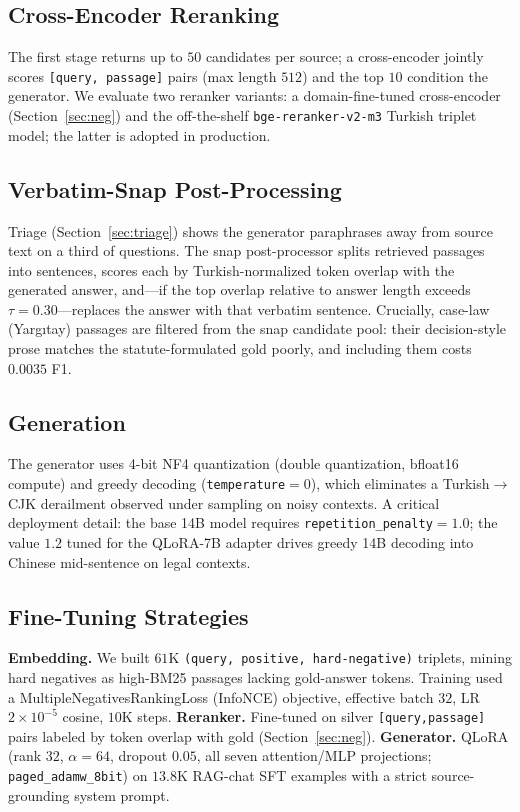 \documentclass[conference]{IEEEtran}
\begin{document}
\subsection{Cross-Encoder Reranking}
The first stage returns up to $50$ candidates per source; a cross-encoder
jointly scores \texttt{[query, passage]} pairs (max length $512$) and the top
$10$ condition the generator. We evaluate two reranker variants: a
domain-fine-tuned cross-encoder (Section~\ref{sec:neg}) and the off-the-shelf
\texttt{bge-reranker-v2-m3} Turkish triplet model; the latter is adopted in
production.

\subsection{Verbatim-Snap Post-Processing}
Triage (Section~\ref{sec:triage}) shows the generator paraphrases away from
source text on a third of questions. The snap post-processor splits retrieved
passages into sentences, scores each by Turkish-normalized token overlap with
the generated answer, and---if the top overlap relative to answer length exceeds
$\tau{=}0.30$---replaces the answer with that verbatim sentence. Crucially,
case-law (Yarg\i tay) passages are filtered from the snap candidate pool: their
decision-style prose matches the statute-formulated gold poorly, and including
them costs $0.0035$ F1.

\subsection{Generation}
The generator uses 4-bit NF4 quantization (double quantization, bfloat16
compute) and greedy decoding (\texttt{temperature}$=0$), which eliminates a
Turkish$\rightarrow$CJK derailment observed under sampling on noisy contexts.
A critical deployment detail: the base 14B model requires
\texttt{repetition\_penalty}$=1.0$; the value $1.2$ tuned for the QLoRA-7B
adapter drives greedy 14B decoding into Chinese mid-sentence on legal contexts.

\subsection{Fine-Tuning Strategies}
\textbf{Embedding.} We built $61$K \texttt{(query, positive, hard-negative)}
triplets, mining hard negatives as high-BM25 passages lacking gold-answer
tokens. Training used a MultipleNegativesRankingLoss (InfoNCE) objective,
effective batch $32$, LR $2{\times}10^{-5}$ cosine, $10$K steps.
\textbf{Reranker.} Fine-tuned on silver \texttt{[query,passage]} pairs labeled
by token overlap with gold (Section~\ref{sec:neg}).
\textbf{Generator.} QLoRA (rank $32$, $\alpha{=}64$, dropout $0.05$, all seven
attention/MLP projections; \texttt{paged\_adamw\_8bit}) on $13.8$K RAG-chat SFT
examples with a strict source-grounding system prompt.
\end{document}
